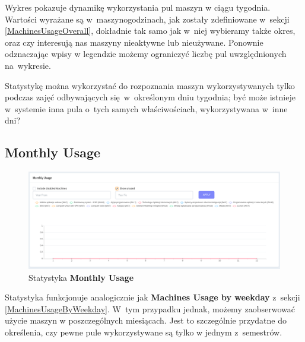 \documentclass[a5paper, twoside, openany]{book}
\begin{document}
  Wykres pokazuje dynamikę wykorzystania pul maszyn w ciągu tygodnia. Wartości wyrażane są w~maszynogodzinach, jak zostały zdefiniowane w~sekcji \ref{MachinesUsageOverall}, dokładnie tak samo jak w~niej wybieramy także okres, oraz czy interesują nas maszyny nieaktywne lub nieużywane. Ponownie odznaczając wpisy w legendzie możemy ograniczyć liczbę pul uwzględnionych na~wykresie.

  Statystykę można wykorzystać do rozpoznania maszyn wykorzystywanych tylko podczas zajęć odbywających się~w~określonym dniu tygodnia; być może istnieje w~systemie inna pula o~tych samych właściwościach, wykorzystywana w~inne dni?

  \subsection{Monthly Usage}

  \begin{figure}[H]
    \centerline{\includegraphics[width=0.9 \textwidth]{statistics_3}}
    \caption{Statystyka \textbf{Monthly Usage}}
  \end{figure}

  Statystyka funkcjonuje analogicznie jak \textbf{Machines Usage by weekday} z~sekcji \ref{MachinesUsageByWeekday}. W~tym przypadku jednak, możemy zaobserwować użycie maszyn w poszczególnych miesiącach. Jest to szczególnie przydatne do określenia, czy pewne pule wykorzystywane są tylko w jednym z~semestrów.
\end{document}
